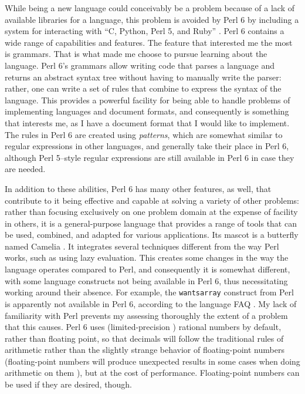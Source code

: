 \documentclass[14pt,english]{extarticle}
\begin{document}
While being a new language could conceivably be a problem because
of a lack of available libraries for a language, this problem is avoided
by Perl 6 by including a system for interacting with ``C, Python,
Perl 5, and Ruby'' \cite[p. 2]{Lenz2017}. Perl 6 contains a wide
range of capabilities and features. The feature that interested me
the most is grammars. That is what made me choose to pursue learning
about the language. Perl 6's grammars allow writing code that parses
a language and returns an abstract syntax tree without having to manually
write the parser: rather, one can write a set of rules that combine
to express the syntax of the language. This provides a powerful facility
for being able to handle problems of implementing languages and document
formats, and consequently is something that interests me, as I have
a document format that I would like to implement. The rules in Perl
6 are created using \emph{patterns}, which are somewhat similar to
regular expressions in other languages, and generally take their place
in Perl 6, although Perl 5–style regular expressions are still available
in Perl 6 in case they are needed.

In addition to these abilities, Perl 6 has many other features, as
well, that contribute to it being effective and capable at solving
a variety of other problems: rather than focusing exclusively on one
problem domain at the expense of facility in others, it is a general-purpose
language that provides a range of tools that can be used, combined,
and adapted for various applications. \cite{Documentation} Its mascot
is a butterfly named Camelia \cite{Documentation}. It integrates
several techniques different from the way Perl works, such as using
lazy evaluation. This creates some changes in the way the language
operates compared to Perl, and consequently it is somewhat different,
with some language constructs not being available in Perl 6, thus
necessitating working around their absence. For example, the \texttt{wantsarray}
construct from Perl is apparently not available in Perl 6, according
to the language FAQ \cite{P6FAQ}. My lack of familiarity with Perl
prevents my assessing thoroughly the extent of a problem that this
causes. Perl 6 uses (limited-precision \cite{News}) rational numbers
by default, rather than floating point, so that decimals will follow
the traditional rules of arithmetic rather than the slightly strange
behavior of floating-point numbers (floating-point numbers will produce
unexpected results in some cases when doing arithmetic on them \cite{Overflow}),
but at the cost of performance. Floating-point numbers can be used
if they are desired, though.
\end{document}

